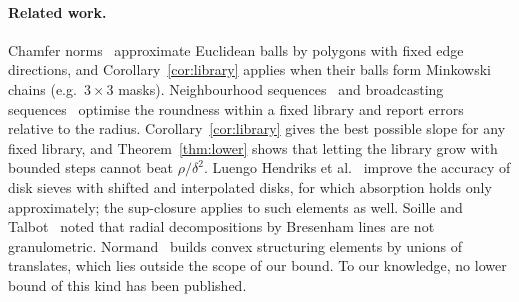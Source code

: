 \documentclass[runningheads]{llncs}
\begin{document}
\paragraph{Related work.} Chamfer norms~\cite{borgefors1986} approximate Euclidean balls by polygons with fixed edge directions, and Corollary~\ref{cor:library} applies when their balls form Minkowski chains (e.g.\ $3\times3$ masks). Neighbourhood sequences~\cite{farkas2006,mukherjee2016} and broadcasting sequences~\cite{song2019} optimise the roundness within a fixed library and report errors relative to the radius. Corollary~\ref{cor:library} gives the best possible slope for any fixed library, and Theorem~\ref{thm:lower} shows that letting the library grow with bounded steps cannot beat $\rho/\delta^2$. Luengo Hendriks et al.~\cite{luengo2007} improve the accuracy of disk sieves with shifted and interpolated disks, for which absorption holds only approximately; the sup-closure applies to such elements as well. Soille and Talbot~\cite{soille2001} noted that radial decompositions by Bresenham lines are not granulometric. Normand~\cite{normand2003} builds convex structuring elements by unions of translates, which lies outside the scope of our bound. To our knowledge, no lower bound of this kind has been published.

\end{document}
